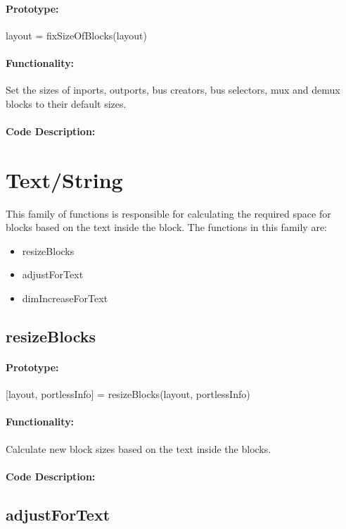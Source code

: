 \documentclass[12pt,letterpaper]{report}
\begin{document}
\paragraph{Prototype:} layout = fixSizeOfBlocks(layout)
\paragraph{Functionality:} Set the sizes of inports, outports, bus creators, bus selectors, mux and demux blocks to their default sizes.
\paragraph{Code Description:}



\section{Text/String}
\par This family of functions is responsible for calculating the required space for blocks based on the text inside the block. The functions in this family are:
\begin{itemize}
	\item resizeBlocks
	\item adjustForText
	\item dimIncreaseForText
\end{itemize}

\subsection{resizeBlocks}
\paragraph{Prototype:} [layout, portlessInfo] = resizeBlocks(layout, portlessInfo)
\paragraph{Functionality:} Calculate new block sizes based on the text inside the blocks.
\paragraph{Code Description:}

\subsection{adjustForText}
\end{document}
